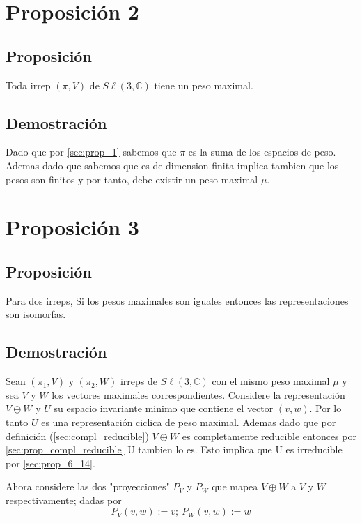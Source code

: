 \documentclass[12pt]{exam}
\begin{document}
\section{Proposición 2}

\subsection{Proposición}

Toda irrep $(\pi, V)$ de $S\ell(3,\mathbb{C})$ tiene un peso maximal.

\subsection{Demostración}

Dado que por \ref{sec:prop_1} sabemos que $\pi$ es la suma de los espacios de peso. Ademas dado que sabemos que es de dimension finita implica tambien que los pesos son finitos y por tanto, debe existir un peso maximal $\mu$.

\section{Proposición 3}

\subsection{Proposición}

Para dos irreps, Si los pesos maximales son iguales entonces las representaciones son isomorfas.

\subsection{Demostración}

Sean $(\pi_1, V)$ y $(\pi_2, W)$ irreps de $S\ell(3, \mathbb{C})$ con el mismo peso maximal $\mu$ y sea $V$ y $W$ los vectores maximales correspondientes. Considere la representación $V \oplus W$ y $U$ su espacio invariante minimo que contiene el vector $(v, w)$. Por lo tanto $U$ es una representación ciclica de peso maximal. Ademas dado que por definición (\ref{sec:compl_reducible}) $V \oplus W$ es completamente reducible entonces por \ref{sec:prop_compl_reducible} U tambien lo es. Esto implica que U es irreducible por \ref{sec:prop_6_14}.

Ahora considere las dos "proyecciones" $P_V$ y $P_W$ que mapea $V \oplus W$ a $V$ y $W$ respectivamente; dadas por
$$P_V (v, w) := v;\ P_W (v, w) := w$$
\end{document}
